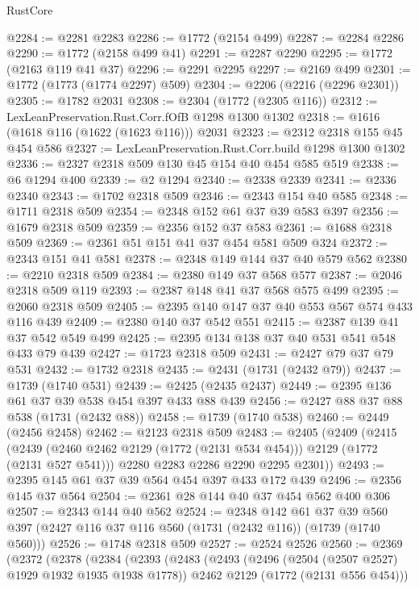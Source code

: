 \begin{lexlean}{RustCore}
\begin{coremodule}
@2284 := @2281 @2283
@2286 := @1772 (@2154 @499)
@2287 := @2284 @2286
@2290 := @1772 (@2158 @499 @41)
@2291 := @2287 @2290
@2295 := @1772 (@2163 @119 @41 @37)
@2296 := @2291 @2295
@2297 := @2169 @499
@2301 := @1772 (@1773 (@1774 @2297) @509)
@2304 := @2206 (@2216 (@2296 @2301))
@2305 := @1782 @2031
@2308 := @2304 (@1772 (@2305 @116))
@2312 := LexLeanPreservation.Rust.Corr.fOfB @1298 @1300 @1302
@2318 := @1616 (@1618 @116 (@1622 (@1623 @116))) @2031
@2323 := @2312 @2318 @155 @45 @454 @586
@2327 := LexLeanPreservation.Rust.Corr.build @1298 @1300 @1302
@2336 := @2327 @2318 @509 @130 @45 @154 @40 @454 @585 @519
@2338 := @6 @1294 @400
@2339 := @2 @1294
@2340 := @2338 @2339
@2341 := @2336 @2340
@2343 := @1702 @2318 @509
@2346 := @2343 @154 @40 @585
@2348 := @1711 @2318 @509
@2354 := @2348 @152 @61 @37 @39 @583 @397
@2356 := @1679 @2318 @509
@2359 := @2356 @152 @37 @583
@2361 := @1688 @2318 @509
@2369 := @2361 @51 @151 @41 @37 @454 @581 @509 @324
@2372 := @2343 @151 @41 @581
@2378 := @2348 @149 @144 @37 @40 @579 @562
@2380 := @2210 @2318 @509
@2384 := @2380 @149 @37 @568 @577
@2387 := @2046 @2318 @509 @119
@2393 := @2387 @148 @41 @37 @568 @575 @499
@2395 := @2060 @2318 @509
@2405 := @2395 @140 @147 @37 @40 @553 @567 @574 @433 @116 @439
@2409 := @2380 @140 @37 @542 @551
@2415 := @2387 @139 @41 @37 @542 @549 @499
@2425 := @2395 @134 @138 @37 @40 @531 @541 @548 @433 @79 @439
@2427 := @1723 @2318 @509
@2431 := @2427 @79 @37 @79 @531
@2432 := @1732 @2318
@2435 := @2431 (@1731 (@2432 @79))
@2437 := @1739 (@1740 @531)
@2439 := @2425 (@2435 @2437)
@2449 := @2395 @136 @61 @37 @39 @538 @454 @397 @433 @88 @439
@2456 := @2427 @88 @37 @88 @538 (@1731 (@2432 @88))
@2458 := @1739 (@1740 @538)
@2460 := @2449 (@2456 @2458)
@2462 := @2123 @2318 @509
@2483 := @2405
    (@2409
      (@2415
        (@2439 (@2460 @2462 @2129 (@1772 (@2131 @534 @454))) @2129 (@1772 (@2131 @527 @541)))
        @2280
        @2283
        @2286
        @2290
        @2295
        @2301))
@2493 := @2395 @145 @61 @37 @39 @564 @454 @397 @433 @172 @439
@2496 := @2356 @145 @37 @564
@2504 := @2361 @28 @144 @40 @37 @454 @562 @400 @306
@2507 := @2343 @144 @40 @562
@2524 := @2348
    @142
    @61
    @37
    @39
    @560
    @397
    (@2427 @116 @37 @116 @560 (@1731 (@2432 @116)) (@1739 (@1740 @560)))
@2526 := @1748 @2318 @509
@2527 := @2524 @2526
@2560 := @2369
    (@2372
      (@2378
        (@2384
          (@2393
            (@2483
              (@2493
                (@2496 (@2504 (@2507 @2527) @1929 @1932 @1935 @1938 @1778))
                @2462
                @2129
                (@1772 (@2131 @556 @454)))

\end{coremodule}
\end{lexlean}
